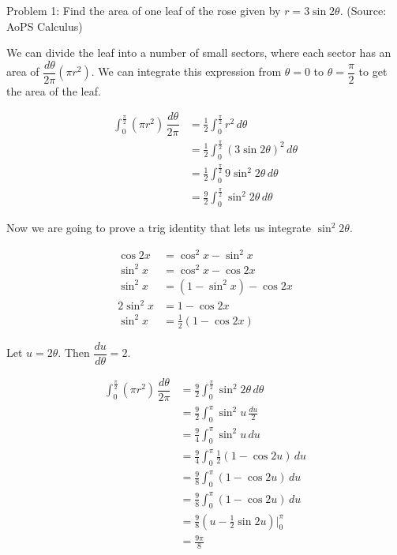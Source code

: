 Problem 1: Find the area of one leaf of the rose given by $r = 3 \sin 2\theta$. (Source: AoPS Calculus)

We can divide the leaf into a number of small sectors, where each sector has an area of $\dfrac{d\theta}{2\pi} (\pi r^2)$. We can integrate this expression from $\theta = 0$ to $\theta = \dfrac{\pi}{2}$ to get the area of the leaf.

\begin{align*}
\int_0^{\frac{\pi}{2}} (\pi r^2) \, \dfrac{d\theta}{2\pi} 
&= \frac{1}{2} \int_0^{\frac{\pi}{2}} r^2 \, d\theta \\
&= \frac{1}{2} \int_0^{\frac{\pi}{2}} (3 \sin 2\theta)^2 \, d\theta \\
&= \frac{1}{2} \int_0^{\frac{\pi}{2}} 9 \sin^2 2\theta \, d\theta \\
&= \frac{9}{2} \int_0^{\frac{\pi}{2}} \sin^2 2\theta \, d\theta
\end{align*}

Now we are going to prove a trig identity that lets us integrate $\sin^2 2\theta$.

\begin{align*}
\cos 2x &= \cos^2 x - \sin^2 x \\
\sin^2x &= \cos^2 x - \cos 2x \\
\sin^2x &= (1 - \sin^2 x) - \cos 2x \\
2 \sin^2 x &= 1 - \cos 2x \\
\sin^2 x &= \frac{1}{2} (1 - \cos 2x)
\end{align*}

Let $u = 2\theta$. Then $\dfrac{du}{d\theta} = 2$.

\begin{align*}
\int_0^{\frac{\pi}{2}} (\pi r^2) \, \dfrac{d\theta}{2\pi}
&= \frac{9}{2} \int_0^{\frac{\pi}{2}} \sin^2 2\theta \, d\theta \\
&= \frac{9}{2} \int_0^{\pi} \sin^2 u \, \frac{du}{2} \\
&= \frac{9}{4} \int_0^{\pi} \sin^2 u \, du \\
&= \frac{9}{4} \int_0^{\pi} \frac{1}{2} (1 - \cos 2u) \, du \\
&= \frac{9}{8} \int_0^{\pi} (1 - \cos 2u) \, du \\
&= \frac{9}{8} \int_0^{\pi} (1 - \cos 2u) \, du \\
&= \frac{9}{8} (u - \frac{1}{2} \sin 2u) \Bigg|_0^\pi \\
&= \boxed{\frac{9\pi}{8}}
\end{align*}
